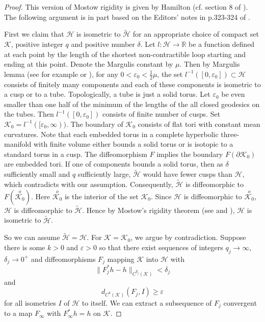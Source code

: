 \begin{proof} This version of Mostow rigidity is given by Hamilton
(cf. section 8 of \cite{Ha99}). The following argument is in part
based on the Editors' notes in p.323-324 of \cite{CCCY}.

First we claim that $\mathcal{H}$ is isometric to
$\mathcal{\tilde{H}}$ for an appropriate choice of compact set
$\mathcal{K}$, positive integer $q$ and positive number $\delta$.
Let $l: \mathcal{H}\rightarrow \mathbb{R}$ be a function defined
at each point by the length of the shortest non-contractible loop
starting and ending at this point. Denote the Margulis constant by
$\mu$. Then by Margulis lemma (see for example \cite{Gro79} or
\cite{KM}), for any $0<\varepsilon_0<\frac{1}{2}\mu$, the set
$l^{-1}([0,\varepsilon_0])\subset \mathcal{H}$ consists of
finitely many components and each of these components is isometric
to a cusp or to a tube. Topologically, a tube is just a solid
torus. Let $\varepsilon_0$ be even smaller than one half of the
minimum of the lengths of the all closed geodesics on the tubes.
Then $l^{-1}([0,\varepsilon_0])$ consists of finite number of
cusps. Set $\mathcal{K}_0 = l^{-1}([\varepsilon_0,\infty))$. The
boundary of $\mathcal{K}_0$ consists of flat tori with constant
mean curvatures. Note that each embedded torus in a complete
hyperbolic three-manifold with finite volume either bounds a solid
torus or is isotopic to a standard torus in a cusp. The
diffeomorphism $F$ implies the boundary $F(\partial\mathcal{K}_0)$
are embedded tori. If one of components bounds a solid torus, then
as $\delta$ sufficiently small and $q$ sufficiently large,
$\mathcal{\tilde{H}}$ would have fewer cusps than $\mathcal{H}$,
which contradicts with our assumption. Consequently,
$\mathcal{\tilde{H}}$ is diffeomorphic to
$F({\overset{o}{\mathcal{K}_0}})$. Here
${\overset{o}{\mathcal{K}_0}}$ is the interior of the set
$\mathcal{K}_0$.  Since $\mathcal{H}$ is diffeomorphic to
${\overset{o}{\mathcal{K}_0}}$, $\mathcal{H}$ is diffeomorphic to
$\mathcal{\tilde{H}}$.  Hence by Mostow's rigidity theorem (see
\cite{Mos} and \cite{Pr}), $\mathcal{H}$ is isometric to
$\mathcal{\tilde{H}}$.

So we can assume $\mathcal{\tilde{H}}=\mathcal{H}$.  For
$\mathcal{K} = \mathcal{K}_0$, we argue by contradiction. Suppose
there is some $k>0$ and $\varepsilon>0$ so that there exist
sequences of integers $q_j\rightarrow\infty$, $\delta_j\rightarrow
0^+$ and diffeomorphisms $F_j$ mapping $\mathcal{K}$ into
$\mathcal{H}$ with
$$
  \|F_j^{*}h-h\|_{C^{q_j}(\mathcal{K})}<\delta_j
$$
 and
$$
 d_{C^{k}(\mathcal{K})}(F_j,I)\geq \varepsilon
$$
for all isometries $I$ of $\mathcal{H}$ to itself. We can extract
a subsequence of $F_j$ convergent to a map $F_{\infty}$ with
$F_{\infty}^{*}h=h$ on $\mathcal{K}$.


\end{proof}
